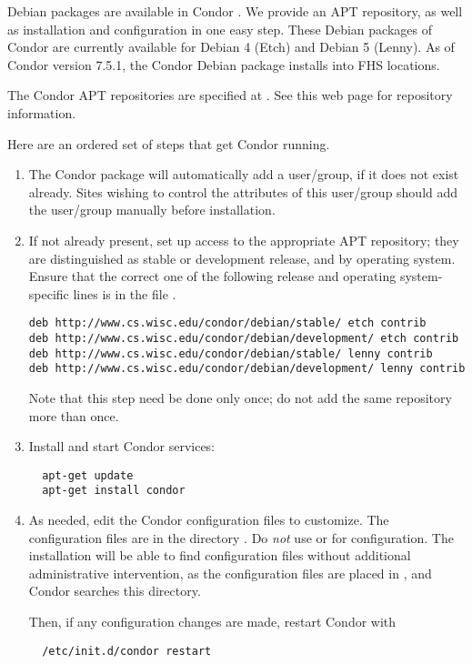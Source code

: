 Debian packages are available in Condor \VersionNotice.
We provide an APT repository, as well as 
installation and configuration in one easy step.
These Debian packages of Condor are currently available for 
Debian 4 (Etch) and Debian 5 (Lenny).
As of Condor version 7.5.1, 
the Condor Debian package installs into FHS locations.

The Condor APT repositories are specified at
  .
See this web page for repository information.

Here are an ordered set of steps that get Condor running.
\begin{enumerate}
\item The Condor package will automatically add a  user/group,
if it does not exist already.
Sites wishing to control the attributes of this user/group 
should add the  user/group manually before installation.

\item If not already present,
set up access to the appropriate APT repository;
they are distinguished as stable or development release,
and by operating system. 
Ensure that the correct one of the following release and 
operating system-specific lines is in 
the file  .
\footnotesize
\begin{verbatim}
deb http://www.cs.wisc.edu/condor/debian/stable/ etch contrib
deb http://www.cs.wisc.edu/condor/debian/development/ etch contrib
deb http://www.cs.wisc.edu/condor/debian/stable/ lenny contrib
deb http://www.cs.wisc.edu/condor/debian/development/ lenny contrib
\end{verbatim}
\normalsize
Note that this step need be done only once;
do not add the same repository more than once.

\item Install and start Condor services:
\begin{verbatim}
  apt-get update
  apt-get install condor
\end{verbatim}

\item As needed, edit the Condor configuration files to customize.
The configuration files are in the directory  .
Do \emph{not} use  or  for configuration.
The installation will be able to find configuration files without
additional administrative intervention,
as the configuration files are placed in ,
and Condor searches this directory.

Then, if any configuration changes are made, restart Condor with
\begin{verbatim}
  /etc/init.d/condor restart
\end{verbatim}

\end{enumerate}

